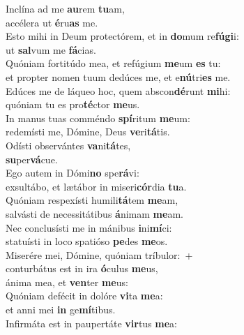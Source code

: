 \evenverse Inclína ad me \textbf{au}rem \textbf{tu}am,~\*\\
\evenverse accélera ut \textbf{é}ru\textbf{as} me.\\
\oddverse Esto mihi in Deum protectórem, et in \textbf{do}mum re\textbf{fú}\textbf{gi}i:~\*\\
\oddverse ut \textbf{sal}vum me \textbf{fá}cias.\\
\evenverse Quóniam fortitúdo mea, et refúgium \textbf{me}um \textbf{es} tu:~\*\\
\evenverse et propter nomen tuum dedúces me, et e\textbf{nú}tri\textbf{es} me.\\
\oddverse Edúces me de láqueo hoc, quem abscon\textbf{dé}runt \textbf{mi}hi:~\*\\
\oddverse quóniam tu es pro\textbf{té}ctor \textbf{me}us.\\
\evenverse In manus tuas comméndo \textbf{spí}ritum \textbf{me}um:~\*\\
\evenverse redemísti me, Dómine, Deus \textbf{ve}ri\textbf{tá}tis.\\
\oddverse Odísti observántes \textbf{va}ni\textbf{tá}tes,~\*\\
\oddverse \textbf{su}per\textbf{vá}cue.\\
\evenverse Ego autem in Dómi\textbf{no} spe\textbf{rá}vi:~\*\\
\evenverse exsultábo, et lætábor in miseri\textbf{cór}dia \textbf{tu}a.\\
\oddverse Quóniam respexísti humili\textbf{tá}tem \textbf{me}am,~\*\\
\oddverse salvásti de necessitátibus \textbf{á}nimam \textbf{me}am.\\
\evenverse Nec conclusísti me in mánibus \textbf{i}ni\textbf{mí}ci:~\*\\
\evenverse statuísti in loco spatióso \textbf{pe}des \textbf{me}os.\\
\oddverse Miserére mei, Dómine, quóniam tríbulor:~+\\
\oddverse  conturbátus est in ira \textbf{ó}culus \textbf{me}us,~\*\\
\oddverse ánima mea, et \textbf{ven}ter \textbf{me}us:\\
\evenverse Quóniam defécit in dolóre \textbf{vi}ta \textbf{me}a:~\*\\
\evenverse et anni mei \textbf{in} ge\textbf{mí}tibus.\\
\oddverse Infirmáta est in paupertáte \textbf{vir}tus \textbf{me}a:~\*\\
